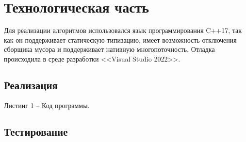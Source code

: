\chapter{Технологическая часть}

Для реализации алгоритмов использовался язык программирования C++17, так как он поддерживает статическую типизацию, имеет возможность отключения сборщика мусора и поддерживает нативную многопоточность. Отладка происходила в среде разработки <<Visual Studio 2022>>.

\section{Реализация}


Листинг 1 -- Код программы.

\section{Тестирование}

